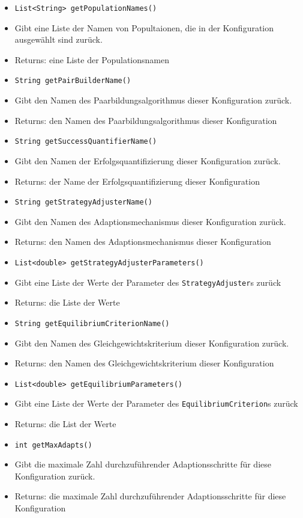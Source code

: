 \documentclass[parskip=full,11pt]{scrartcl}
\begin{document}
\begin{itemize}
	\item \texttt{List<String> getPopulationNames()}
	\item[] Gibt eine Liste der Namen von Popultaionen, die in der Konfiguration ausgewählt sind zurück.
	\item[] Returns: eine Liste der Populationsnamen
	
	\item \texttt{String getPairBuilderName()}
	\item[] Gibt den Namen des  Paarbildungsalgorithmus dieser Konfiguration zurück.
	\item[] Returns: den Namen des Paarbildungsalgorithmus dieser Konfiguration
	
	\item \texttt{String getSuccessQuantifierName()}
	\item[] Gibt den Namen der Erfolgsquantifizierung dieser Konfiguration zurück.
	\item[] Returns: der Name der Erfolgsquantifizierung dieser Konfiguration
	
	\item \texttt{String getStrategyAdjusterName()}
	\item[] Gibt den Namen des Adaptionsmechanismus dieser Konfiguration zurück.
	\item[] Returns: den Namen des Adaptionsmechanismus dieser Konfiguration
	
	\item \texttt{List<double> getStrategyAdjusterParameters()}
	\item[] Gibt eine Liste der Werte der Parameter des \texttt{StrategyAdjuster}s zurück
	\item[] Returns: die Liste der Werte
	
	
	\item \texttt{String getEquilibriumCriterionName()}
	\item[] Gibt den Namen des  Gleichgewichtskriterium dieser Konfiguration zurück.
	\item[] Returns: den Namen des Gleichgewichtskriterium dieser Konfiguration
	
	\item \texttt{List<double> getEquilibriumParameters()}
	\item[] Gibt eine Liste der Werte der Parameter des \texttt{EquilibriumCriterion}s zurück
	\item[] Returns: die List der Werte
	
	\item \texttt{int getMaxAdapts()}
	\item[] Gibt die maximale Zahl durchzuführender Adaptionsschritte für diese Konfiguration zurück.
	\item[] Returns: die maximale Zahl durchzuführender Adaptionsschritte für diese Konfiguration
	

\end{itemize}
\end{document}
